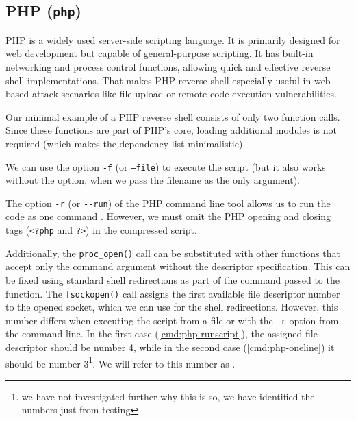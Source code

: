 \subsection{PHP (\texttt{php})}


PHP is a widely used server-side scripting language. It is primarily designed for web development but capable of general-purpose scripting. It has built-in networking and process control functions, allowing quick and effective reverse shell implementations. That makes PHP reverse shell especially useful in web-based attack scenarios like file upload or remote code execution vulnerabilities.

Our minimal example of a PHP reverse shell consists of only two function calls. Since these functions are part of PHP's core, loading additional modules is not required (which makes the dependency list minimalistic).


We can use the option \texttt{-f} (or \texttt{--file}) to execute the script (but it also works without the option, when we pass the filename as the only argument).


The option \texttt{-r} (or \texttt{-{}-run}) of the PHP command line tool allows us to run the code as one command \cite{php-man}. However, we must omit the PHP opening and closing tags (\texttt{<?php} and \texttt{?>}) in the compressed script.


Additionally, the \texttt{proc\_open()} call can be substituted with other functions that accept only the command argument without the descriptor specification. This can be fixed using standard shell redirections as part of the command passed to the function. The \texttt{fsockopen()} call assigns the first available file descriptor number to the opened socket, which we can use for the shell redirections. However, this number differs when executing the script from a file or with the \texttt{-r} option from the command line. In the first case (\cref{cmd:php-runscript}), the assigned file descriptor should be number 4, while in the second case (\cref{cmd:php-oneline}) it should be number 3\footnote{we have not investigated further why this is so, we have identified the numbers just from testing}. We will refer to this number as \fd.

